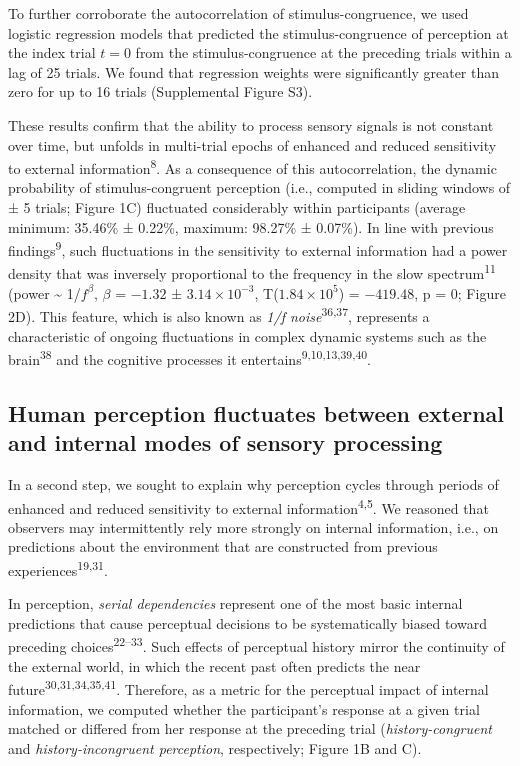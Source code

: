 \documentclass[
]{article}
\begin{document}
To further corroborate the autocorrelation of stimulus-congruence, we
used logistic regression models that predicted the stimulus-congruence
of perception at the index trial \(t = 0\) from the stimulus-congruence
at the preceding trials within a lag of 25 trials. We found that
regression weights were significantly greater than zero for up to 16
trials (Supplemental Figure S3).

These results confirm that the ability to process sensory signals is not
constant over time, but unfolds in multi-trial epochs of enhanced and
reduced sensitivity to external information\textsuperscript{8}. As a
consequence of this autocorrelation, the dynamic probability of
stimulus-congruent perception (i.e., computed in sliding windows of ± 5
trials; Figure 1C) fluctuated considerably within participants (average
minimum: 35.46\% ± 0.22\%, maximum: 98.27\% ± 0.07\%). In line with
previous findings\textsuperscript{9}, such fluctuations in the
sensitivity to external information had a power density that was
inversely proportional to the frequency in the slow
spectrum\textsuperscript{11} (power \textasciitilde{} 1/\(f^\beta\),
\(\beta\) = \(-1.32\) ± \(\ensuremath{3.14\times 10^{-3}}\),
T(\(\ensuremath{1.84\times 10^{5}}\)) = \(-419.48\), p = \(0\); Figure
2D). This feature, which is also known as \emph{1/f
noise}\textsuperscript{36,37}, represents a characteristic of ongoing
fluctuations in complex dynamic systems such as the
brain\textsuperscript{38} and the cognitive processes it
entertains\textsuperscript{9,10,13,39,40}.

\hypertarget{human-perception-fluctuates-between-external-and-internal-modes-of-sensory-processing}{%
\subsection{Human perception fluctuates between external and internal
modes of sensory
processing}\label{human-perception-fluctuates-between-external-and-internal-modes-of-sensory-processing}}

In a second step, we sought to explain why perception cycles through
periods of enhanced and reduced sensitivity to external
information\textsuperscript{4,5}. We reasoned that observers may
intermittently rely more strongly on internal information, i.e., on
predictions about the environment that are constructed from previous
experiences\textsuperscript{19,31}.

In perception, \emph{serial dependencies} represent one of the most
basic internal predictions that cause perceptual decisions to be
systematically biased toward preceding choices\textsuperscript{22--33}.
Such effects of perceptual history mirror the continuity of the external
world, in which the recent past often predicts the near
future\textsuperscript{30,31,34,35,41}. Therefore, as a metric for the
perceptual impact of internal information, we computed whether the
participant's response at a given trial matched or differed from her
response at the preceding trial (\emph{history-congruent} and
\emph{history-incongruent perception}, respectively; Figure 1B and C).
\end{document}
